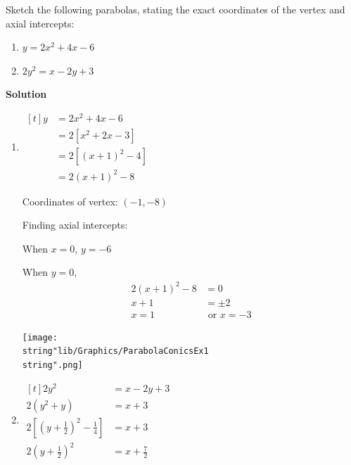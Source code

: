 \documentclass[11pt,a4paper]{book}
\begin{document}
\begin{example}{}
Sketch the following parabolas, stating the exact coordinates of the
vertex and axial intercepts:

\begin{enumerate}[label=(\alph*)]

\item $y=2x^{2}+4x-6$

\item $2y^{2}=x-2y+3$

\end{enumerate}

\textbf{Solution}

\begin{enumerate}[label=(\alph*)]

\item

\begin{minipage}[t]{0.5\textwidth}

$
\begin{aligned}[t]
y & =2x^{2}+4x-6\\
 & =2\left[x^{2}+2x-3\right]\\
 & =2\left[\left(x+1\right)^{2}-4\right]\\
 & =2\left(x+1\right)^{2}-8
\end{aligned}
$

Coordinates of vertex: $\left(-1,-8\right)$

Finding axial intercepts:

When $x=0$, $y=-6$


When $y=0$,
\begin{align*}
2\left(x+1\right)^{2}-8 & =0\\
x+1 & =\pm2\\
x=1 & \text{ or }x=-3
\end{align*}

\end{minipage}
\begin{minipage}[t]{0.5\textwidth}
\begin{center}
\texttt{[image: \\string"lib/Graphics/ParabolaConicsEx1\\string".png]}
\par\end{center}

\end{minipage}

\item \begin{minipage}[t]{0.5\textwidth}
$
\begin{aligned}[t]
2y^{2} & =x-2y+3\\
2\left(y^{2}+y\right) & =x+3\\
2\left[\left(y+\frac{1}{2}\right)^{2}-\frac{1}{4}\right] & =x+3\\
2\left(y+\frac{1}{2}\right)^{2} & =x+\frac{7}{2}
\end{aligned}
$


\end{minipage}
\end{enumerate}
\end{example}
\end{document}
